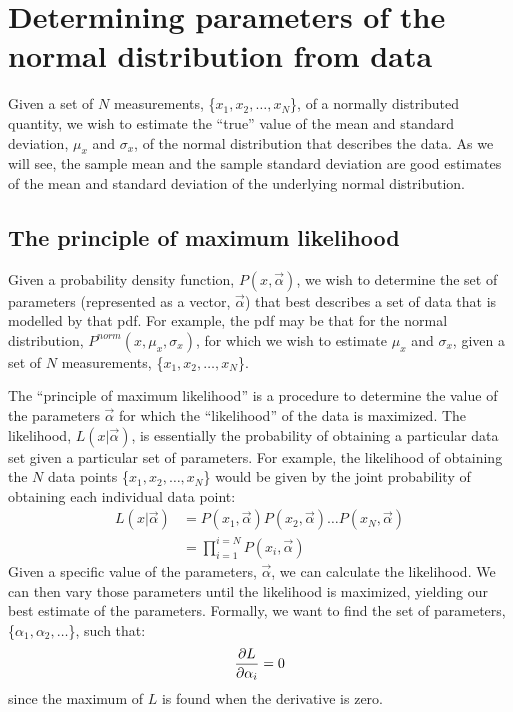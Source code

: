 \section{Determining parameters of the normal distribution from data}
Given a set of $N$ measurements, \{$x_1, x_2, \dots,x_N$\}, of a normally distributed quantity, we wish to estimate the ``true'' value of the mean and standard deviation, $\mu_x$ and $\sigma_x$, of the normal distribution that describes the data. As we will see, the sample mean and the sample standard deviation are good estimates of the mean and standard deviation of the underlying normal distribution.

\subsection{The principle of maximum likelihood}
Given a probability density function, $P(x,\vec\alpha)$, we wish to determine the set of parameters (represented as a vector, $\vec\alpha$) that best describes a set of data that is modelled by that pdf.  For example, the pdf may be that for the normal distribution, $P^{norm}(x,\mu_x,\sigma_x)$, for which we wish to estimate $\mu_x$ and $\sigma_x$, given a set of $N$ measurements, \{$x_1, x_2, \dots,x_N$\}.

The ``principle of maximum likelihood'' is a procedure to determine the value of the parameters $\vec\alpha$ for which the ``likelihood'' of the data is maximized. The likelihood, $L(x|\vec\alpha)$, is essentially the probability of obtaining a particular data set given a particular set of parameters. For example, the likelihood of obtaining the $N$ data points \{$x_1, x_2, \dots,x_N$\} would be given by the joint probability of obtaining each individual data point:
\begin{align}
L(x|\vec\alpha)&=P(x_1,\vec\alpha)P(x_2,\vec\alpha)\dots P(x_N,\vec\alpha)\nonumber\\
&=\prod_{i=1}^{i=N}P(x_i,\vec\alpha)
\end{align}
Given a specific value of the parameters, $\vec\alpha$, we can calculate the likelihood. We can then vary those parameters until the likelihood is maximized, yielding our best estimate of the parameters. Formally, we want to find the set of parameters, \{$\alpha_1,\alpha_2,\dots$\}, such that:
\begin{align}
\frac{\partial L}{\partial \alpha_i}=0
\end{align}
since the maximum of $L$ is found when the derivative is zero.
